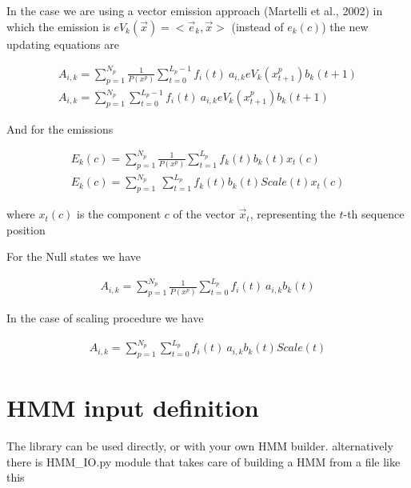 \documentclass[11pt,english]{article}
\begin{document}
In the case we are using a vector emission approach (Martelli et al., 2002)
in which the emission is \( eV_{k}(\overrightarrow{x})=<\overrightarrow{e}_{k},\overrightarrow{x}> \) (instead of \( e_{k}(c) \)) the new updating equations
are


\[
\begin{array}{c}
A_{i,k}=\sum ^{N_{p}}_{p=1}\frac{1}{P(x^{p})}\sum ^{L_{p}-1}_{t=0}f_{i}(t)\: a_{i,k}eV_{k}(x^{p}_{t+1})b_{k}(t+1)\\
A_{i,k}=\sum ^{N_{p}}_{p=1}\sum ^{L_{p}-1}_{t=0}f_{i}(t)\: a_{i,k}eV_{k}(x^{p}_{t+1})b_{k}(t+1)
\end{array}\]


And for the emissions

\[
\begin{array}{c}
E_{k}(c)=\sum ^{N_{p}}_{p=1}\frac{1}{P(x^{p})}\sum ^{L_{p}}_{t=1}f_{k}(t)b_{k}(t)x_{t}(c)\\
E_{k}(c)=\sum ^{N_{p}}_{p=1}\: \sum ^{L_{p}}_{t=1}f_{k}(t)b_{k}(t)Scale(t)x_{t}(c)
\end{array}\]

where \( x_{t}(c) \) is the component $c$ of the vector \( \overrightarrow{x}_{t} \),
representing the $t$-th sequence position

For the Null states we have 

\[
\begin{array}{c}
A_{i,k}=\sum ^{N_{p}}_{p=1}\frac{1}{P(x^{p})}\sum ^{L_{p}}_{t=0}f_{i}(t)\: a_{i,k}b_{k}(t)
\end{array}\]

In the case of scaling procedure we have

\[
\begin{array}{c}
A_{i,k}=\sum ^{N_{p}}_{p=1}\sum ^{L_{p}}_{t=0}f_{i}(t)\: a_{i,k}b_{k}(t)Scale(t)
\end{array}\]

\section{HMM input definition}

The library can be used directly, or with your own 
HMM builder. alternatively there is HMM\_IO.py module
that takes care of building a HMM from a file like this
\end{document}
